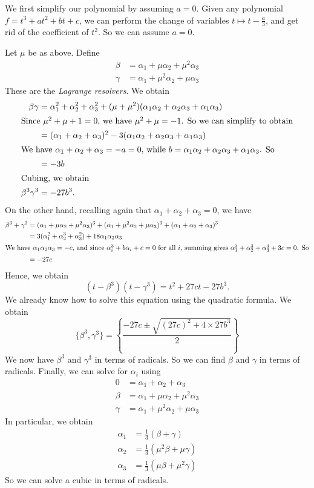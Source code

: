\documentclass[a4paper]{article}
\begin{document}
We first simplify our polynomial by assuming $a = 0$. Given any polynomial $f = t^3 + at^2 + bt + c$, we can perform the change of variables $t\mapsto t - \frac{a}{3}$, and get rid of the coefficient of $t^2$. So we can assume $a = 0$.

Let $\mu$ be as above. Define
\begin{align*}
  \beta &= \alpha_1 + \mu \alpha_2 + \mu^2 \alpha_3\\
  \gamma &= \alpha_1 + \mu^2 \alpha_2 + \mu \alpha_3
\end{align*}
These are the \emph{Lagrange resolvers}. We obtain
\begin{align*}
  \beta\gamma &= \alpha_1^2 + \alpha_2^2 +\alpha_3^2 + (\mu + \mu^2)(\alpha_1\alpha_2 + \alpha_2\alpha_3 + \alpha_1\alpha_3)\\
  \intertext{Since $\mu^2 + \mu + 1 = 0$, we have $\mu^2 + \mu = -1$. So we can simplify to obtain}
  &= (\alpha_1 + \alpha_2 + \alpha_3)^2 - 3(\alpha_1\alpha_2 + \alpha_2\alpha_3 + \alpha_1\alpha_3)\\
  \intertext{We have $\alpha_1 + \alpha_2 + \alpha_3 = -a = 0$, while $b = \alpha_1\alpha_2 + \alpha_2\alpha_3 + \alpha_1\alpha_3$. So}
  &= -3b\\
  \intertext{Cubing, we obtain}
  \beta^3\gamma^3 &= -27b^3.
\end{align*}
On the other hand, recalling again that $\alpha_1 + \alpha_2 + \alpha_3 = 0$, we have
\begin{align*}
  \beta^3 + \gamma^3 &= (\alpha_1 + \mu \alpha_2 + \mu^2 \alpha_3)^3 + (\alpha_1 + \mu^2\alpha_2 + \mu \alpha_3)^3 + (\alpha_1 + \alpha_2 + \alpha_3)^3\\
  &= 3(\alpha_1^2 + \alpha_2^3 + \alpha_3^2) + 18\alpha_1\alpha_2\alpha_3\\
  \intertext{We have $\alpha_1\alpha_2\alpha_3 = -c$, and since $\alpha_i^3 + b\alpha_i + c = 0$ for all $i$, summing gives $\alpha_1^3 + \alpha_2^3 + \alpha_3^3 + 3c = 0$. So}
  &= -27c
\end{align*}
Hence, we obtain
\[
  (t - \beta^3)(t - \gamma^3) = t^2 + 27ct - 27b^3.
\]
We already know how to solve this equation using the quadratic formula. We obtain
\[
  \{\beta^3, \gamma^3\} = \left\{\frac{-27 c \pm \sqrt{(27c)^2 + 4\times 27b^3}}{2}\right\}
\]
We now have $\beta^3$ and $\gamma^3$ in terms of radicals. So we can find $\beta$ and $\gamma$ in terms of radicals. Finally, we can solve for $\alpha_i$ using
\begin{align*}
  0 &= \alpha_1 + \alpha_2 + \alpha_3\\
  \beta &= \alpha_1 + \mu \alpha_2 + \mu^2 \alpha_3\\
  \gamma &= \alpha_1 + \mu^2 \alpha_2 + \mu \alpha_3
\end{align*}
In particular, we obtain
\begin{align*}
  \alpha_1 &= \frac{1}{3}(\beta + \gamma)\\
  \alpha_2 &= \frac{1}{3}(\mu^2 \beta + \mu \gamma)\\
  \alpha_3 &= \frac{1}{3}(\mu \beta + \mu^2 \gamma)
\end{align*}
So we can solve a cubic in terms of radicals.
\end{document}
